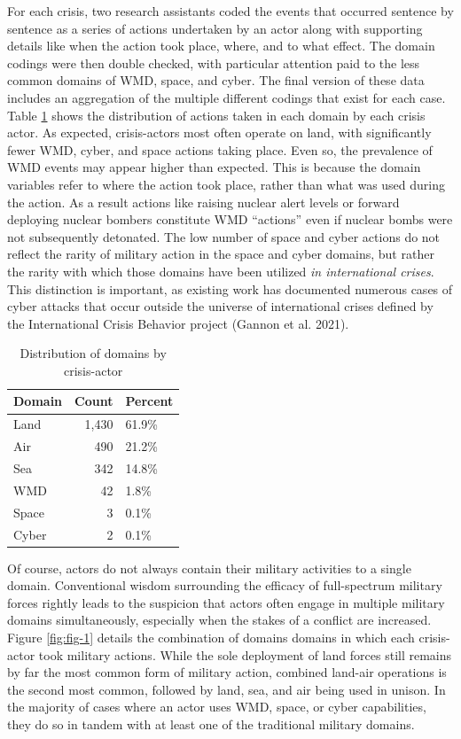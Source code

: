 \documentclass[
]{article}
\begin{document}
For each crisis, two research assistants coded the events that occurred sentence by sentence as a series of actions undertaken by an actor along with supporting details like when the action took place, where, and to what effect. The domain codings were then double checked, with particular attention paid to the less common domains of WMD, space, and cyber. The final version of these data includes an aggregation of the multiple different codings that exist for each case. Table \ref{tab:domain-count} shows the distribution of actions taken in each domain by each crisis actor. As expected, crisis-actors most often operate on land, with significantly fewer WMD, cyber, and space actions taking place. Even so, the prevalence of WMD events may appear higher than expected. This is because the domain variables refer to where the action took place, rather than what was used during the action. As a result actions like raising nuclear alert levels or forward deploying nuclear bombers constitute WMD ``actions'' even if nuclear bombs were not subsequently detonated. The low number of space and cyber actions do not reflect the rarity of military action in the space and cyber domains, but rather the rarity with which those domains have been utilized \textit{in international crises}. This distinction is important, as existing work has documented numerous cases of cyber attacks that occur outside the universe of international crises defined by the International Crisis Behavior project (Gannon et al. 2021).

\begin{table}[H]

\caption{\label{tab:domain-count}Distribution of domains by crisis-actor}
\centering
\begin{tabular}[t]{l|r|l}
\hline
\textbf{Domain} & \textbf{Count} & \textbf{Percent}\\
\hline
Land & 1,430 & 61.9\%\\
\hline
Air & 490 & 21.2\%\\
\hline
Sea & 342 & 14.8\%\\
\hline
WMD & 42 & 1.8\%\\
\hline
Space & 3 & 0.1\%\\
\hline
Cyber & 2 & 0.1\%\\
\hline
\end{tabular}
\end{table}

Of course, actors do not always contain their military activities to a single domain. Conventional wisdom surrounding the efficacy of full-spectrum military forces rightly leads to the suspicion that actors often engage in multiple military domains simultaneously, especially when the stakes of a conflict are increased. Figure \ref{fig:fig-1} details the combination of domains domains in which each crisis-actor took military actions. While the sole deployment of land forces still remains by far the most common form of military action, combined land-air operations is the second most common, followed by land, sea, and air being used in unison. In the majority of cases where an actor uses WMD, space, or cyber capabilities, they do so in tandem with at least one of the traditional military domains.
\end{document}
